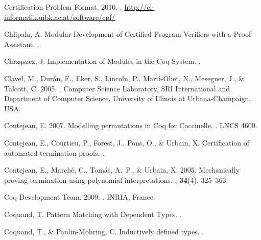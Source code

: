 \begin{thebibliography}{}
Certification Problem Format. 2010.
.
\newblock \url{http://cl-informatik.uibk.ac.at/software/cpf/}

Chlipala, A.
\newblock Modular Development of Certified Program Verifiers with a Proof
  Assistant.
.

Chrz\k{a}szcz, J.
\newblock Implementation of Modules in the {Coq} System.
.

Clavel, M., Dur{\'a}n, F., Eker, S., Lincoln, P., Mart{\'\i}-Oliet, N.,
  Meseguer, J., \& Talcott, C. 2005.
.
\newblock Computer Science Laboratory, SRI International and Department of
  Computer Science, University of Illinois at Urbana-Champaign, USA.


Contejean, E. 2007.
\newblock Modelling permutations in {Coq} for {Coccinelle}.
.
\newblock LNCS 4600.

Contejean, E., Courtieu, P., Forest, J., Pons, O., \& Urbain, X.
\newblock Certification of automated termination proofs.
.

Contejean, E., March{\'e}, C., Tom{\'a}s, A.~P., \& Urbain, X. 2005.
\newblock Mechanically proving termination using polynomial interpretations.
, {\bf 34}(4), 325--363.

{Coq Development Team}. 2009.
.
\newblock INRIA, France.


Coquand, T.
\newblock Pattern Matching with Dependent Types.
.

Coquand, T., \& Paulin-Mohring, C.
\newblock Inductively defined types.
.


\end{thebibliography}
